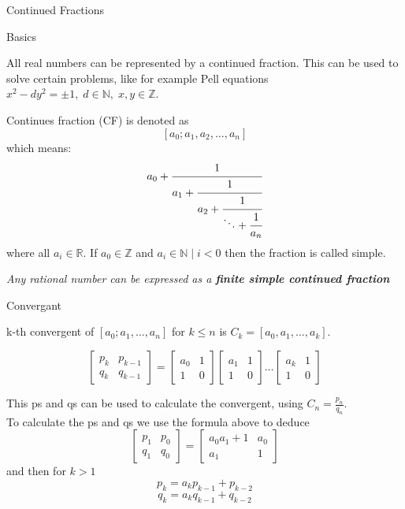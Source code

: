 \documentclass[12pt, letterpaper]{article}
\begin{document}
\begin{section}{Continued Fractions}

  \begin{subsection}{Basics}

    All real numbers can be represented by a continued fraction. This can be
    used to solve certain problems, like for example Pell equations
    \(x^{2} - dy^{2} = \pm 1, \; d \in \mathbb{N}, \; x, y \in \mathbb{Z}\).

    Continues fraction (CF) is denoted as \[[a_{0}; a_{1}, a_{2}, \dots , a_{n}]\]
    which means:
    \[a_{0} + \cfrac{1}{a_{1} + \cfrac{1}{a_{2} + \cfrac{1}{\ddots + \cfrac{1}{a_{n}}
          }}}\]
    where all \(a_{i} \in \mathbb{R}\). If \(a_{0} \in \mathbb{Z}\) and
    \(a_{i} \in \mathbb{N} \;|\; i < 0\) then the fraction is called simple.

    \emph{Any rational number can be expressed as a \textbf{finite simple continued fraction}}

  \end{subsection}

  \begin{subsection}{Convergant}

    k-th convergent of \([a_{0}; a_{1}, \dots , a_{n}]\) for \(k \leq n\) is
    \(C_{k} = [a_{0}, a_{1}, \dots , a_{k}]\).

    \[
      \begin{bmatrix}
        p_{k} & p_{k - 1} \\
        q_{k} & q_{k - 1}
      \end{bmatrix} =
      \begin{bmatrix}
        a_{0} & 1 \\
        1 & 0
      \end{bmatrix}
      \begin{bmatrix}
        a_{1} & 1 \\
        1 & 0
      \end{bmatrix}
      \dots
      \begin{bmatrix}
        a_{k} & 1 \\
        1 & 0
      \end{bmatrix}
    \]

    This ps and qs can be used to calculate the convergent, using
    \(C_{n} = \frac{p_{n}}{q_{n}}\). \\
    To calculate the ps and qs we use the formula above to deduce
    \[
      \begin{bmatrix}
        p_{1} & p_{0} \\
        q_{1} & q_{0}
      \end{bmatrix} =
      \begin{bmatrix}
        a_{0}a_{1} + 1 & a_{0} \\
        a_{1} & 1
      \end{bmatrix}
    \]
    and then for \(k > 1\)
    \[p_{k} = a_{k}p_{k - 1} + p_{k - 2}\]\[q_{k} = a_{k}q_{k - 1} + q_{k - 2}\]


\end{subsection}
\end{section}
\end{document}

